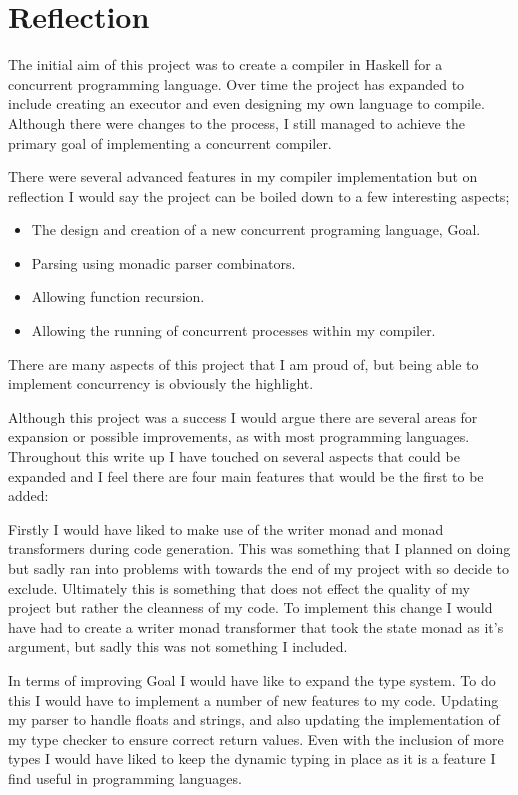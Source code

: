 \section{Reflection}

The initial aim of this project was to create a compiler in Haskell for a concurrent programming language. Over time the project has expanded to include creating an executor and even designing my own language to compile. Although there were changes to the process, I still managed to achieve the primary goal of implementing a concurrent compiler.

There were several advanced features in my compiler implementation but on reflection I would say the project can be boiled down to a few interesting aspects;

\begin{itemize}
\item The design and creation of a new concurrent programing language, Goal.
\item Parsing using monadic parser combinators.
\item Allowing function recursion. 
\item Allowing the running of concurrent processes within my compiler.
\end{itemize}

There are many aspects of this project that I am proud of, but being able to implement concurrency is obviously the highlight. 

Although this project was a success I would argue there are several areas for expansion or possible improvements, as with most programming languages. Throughout this write up I have touched on several aspects that could be expanded and I feel there are four main features that would be the first to be added:

Firstly I would have liked to make use of the writer monad and monad transformers during code generation. This was something that I planned on doing but sadly ran into problems with towards the end of my project with so decide to exclude. Ultimately this is something that does not effect the quality of my project but rather the cleanness of my code. To implement this change I would have had to create a writer monad transformer that took the state monad as it's argument, but sadly this was not something I included.   

In terms of improving Goal I would have like to expand the type system. To do this I would have to implement a number of new features to my code. Updating my parser to handle floats and strings, and also updating the implementation of my type checker to ensure correct return values. Even with the inclusion of more types I would have liked to keep the dynamic typing in place as it is a feature I find useful in programming languages.

